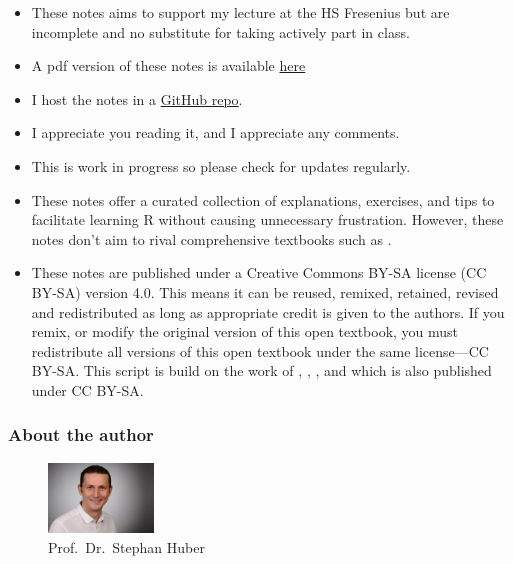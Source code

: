 \documentclass[
  12pt,
  oneside]{book}
\providecommand{\tightlist}{%
  \setlength{\itemsep}{0pt}\setlength{\parskip}{0pt}}
\begin{document}
\begin{itemize}
\tightlist
\item
  These notes aims to support my lecture at the HS Fresenius but are incomplete and no substitute for taking actively part in class.
\item
  A pdf version of these notes is available \href{https://raw.githubusercontent.com/hubchev/hubchev.github.io/main/ds/_main.pdf}{here}
\item
  I host the notes in a \href{https://github.com/hubchev/hubchev.github.io/tree/main/ds}{GitHub repo}.
\item
  I appreciate you reading it, and I appreciate any comments.
\item
  This is work in progress so please check for updates regularly.
\item
  These notes offer a curated collection of explanations, exercises, and tips to facilitate learning R without causing unnecessary frustration. However, these notes don't aim to rival comprehensive textbooks such as \citet{Wickham2023R}.
\item
  These notes are published under a Creative Commons BY-SA license (CC BY-SA) version 4.0. This means it can be reused, remixed, retained, revised and redistributed as long as appropriate credit is given to the authors. If you remix, or modify the original version of this open textbook, you must redistribute all versions of this open textbook under the same license---CC BY-SA. This script is build on the work of \citet{Navarro2020Learning}, \citet{Muschelli2022Introduction}, \citet{Thulin2021Modern}, and \citet{Ismay2022Statistical} which is also published under CC BY-SA.
\end{itemize}

\hypertarget{about-the-author}{%
\subsubsection*{About the author}\label{about-the-author}}

\begin{figure}
\centering
\includegraphics[width=0.25\textwidth,height=\textheight]{fig/huber2.jpeg}
\caption{\label{fig:itsme} Prof.~Dr.~Stephan Huber}
\end{figure}
\end{document}
